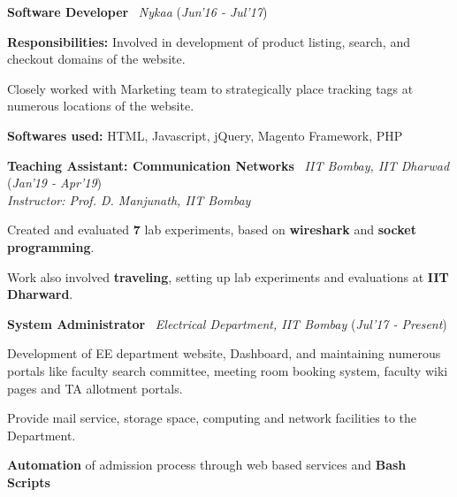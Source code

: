 \documentclass[10pt]{article}
\newcommand{\highlight}[1]{\framecolorbox[\textwidth]{black}{bl}{\makebox[\textwidth][l]{\bfseries \color{black} #1}}}
\newcommand{\mystyle}[1]{\textit{\textit{\textcolor{llb}{#1}}}}
\newcommand{\guide}[1]{\textit{\textit{\textcolor{llb}{#1}}}}
\begin{document}
	\highlight{WORK EXPERIENCE}
	\begin{myitemize}
		\item \textbf{Software Developer} \textpipe\ \mystyle{Nykaa} \hfill{(\textit{Jun'16 - Jul'17})}
		\begin{myitemize}
			\item \textbf{Responsibilities:} Involved in development of product listing, search, and checkout domains of the website.
			\item Closely worked with Marketing team to strategically place tracking tags at numerous locations of the website.
			\item \textbf{Softwares used:} HTML, Javascript, jQuery, Magento Framework, PHP
		\end{myitemize}

		\item \textbf{Teaching Assistant: Communication Networks} \textpipe\ \mystyle{IIT Bombay, IIT Dharwad} \hfill{(\textit{Jan'19 - Apr'19})}\\
		\guide{Instructor: Prof. D. Manjunath, IIT Bombay}
		\begin{myitemize}
			\item Created and evaluated \textbf{7} lab experiments, based on \textbf{wireshark} and \textbf{socket programming}.
			\item Work also involved \textbf{traveling}, setting up lab experiments and evaluations at \textbf{IIT Dharward}.
		\end{myitemize}

		\item \textbf{System Administrator} \textpipe\ \mystyle{Electrical Department, IIT Bombay} \hfill{(\textit{Jul'17 - Present})}
		\begin{myitemize}
			\item Development of EE department website, Dashboard, and maintaining numerous portals like faculty search committee, meeting room booking system, faculty wiki pages and TA allotment portals.
			\item Provide mail service, storage space, computing and network facilities to the Department.
			\item \textbf{Automation} of admission process through web based services and \textbf{Bash Scripts}
		\end{myitemize}
	\end{myitemize}
\end{document}

